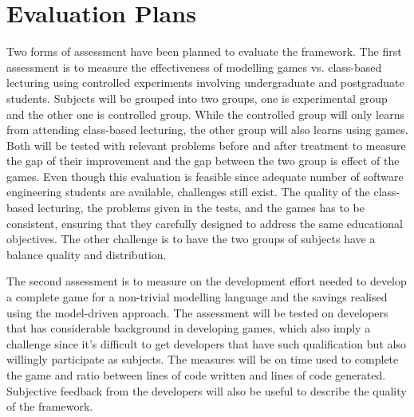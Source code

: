 \documentclass[conference]{IEEEtran}
\begin{document}
\section{Evaluation Plans}
Two forms of assessment have been planned to evaluate the framework. The first assessment is to measure the effectiveness of modelling games vs. class-based lecturing using controlled experiments involving undergraduate and postgraduate students. Subjects will be grouped into two groups, one is experimental group and the other one is controlled group. While the controlled group will only learns from attending class-based lecturing, the other group will also learns using games. Both will be tested with relevant problems before and after treatment to measure the gap of their improvement and the gap between the two group is effect of the games. Even though this evaluation is feasible since adequate number of software engineering students are available, challenges still exist. The quality of the class-based lecturing, the problems given in the tests, and the games has to be consistent, ensuring that they carefully designed to address the same educational objectives. The other challenge is to have the two groups of subjects have a balance quality and distribution. 
  
The second assessment is to measure on the development effort needed to develop a complete game for a non-trivial modelling language and the savings realised using the model-driven approach. The assessment will be tested on developers that has considerable background in developing games, which also imply a challenge since it's difficult to get developers that have such qualification but also willingly participate as subjects. The measures will be on time used to complete the game and ratio between lines of code written and lines of code generated. Subjective feedback from the developers will also be useful to describe the quality of the framework.  
  
\end{document}
